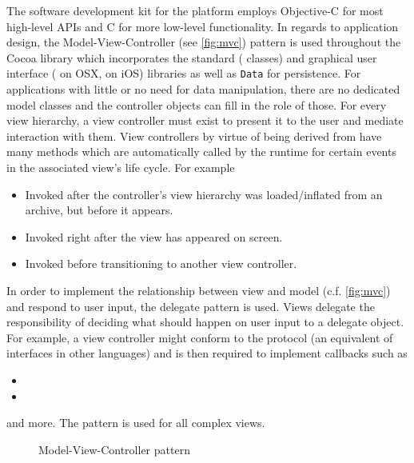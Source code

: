 The software development kit for the platform employs Objective-C for most
high-level APIs and C for more low-level functionality. In regards to
application design, the Model-View-Controller (see \autoref{fig:mvc}) pattern is
used throughout the Cocoa library which incorporates the standard
( classes) and graphical user interface ( on OSX,
 on iOS) libraries as well as  \texttt{Data} for
persistence. For applications with little or no need for data manipulation,
there are no dedicated model classes and the controller objects can fill in the
role of those.  For every view hierarchy, a view
controller must exist to present it to the user and mediate interaction with
them. View controllers by virtue of being derived from 
have many methods which are automatically called by the runtime for certain
events in the associated view's life cycle. For example
\begin{itemize}[align=left]
   \item[\code{viewDidLoad}] Invoked after the controller's view hierarchy was
      loaded/inflated from an archive, but before it appears.
   \item[\code{viewDidAppear}] Invoked right after the view has appeared on
      screen.
   \item[\code{prepareForSegue}] Invoked before transitioning to another view
      controller.
\end{itemize}

In order to implement the relationship between view and model (c.f.
\autoref{fig:mvc}) and respond to user input, the delegate pattern \citep[ch. 1.6]{gamma1995}
is used. Views delegate the responsibility of deciding what should happen on
user input to a delegate object. For example, a view controller might conform to
the  protocol (an equivalent of interfaces in other
languages) and is then required to implement callbacks such as
\begin{itemize}
   \item {}
   \item {}
\end{itemize}
and more. The pattern is used for all complex views.

\begin{figure}[h]
   {\centering      
      
      \caption{Model-View-Controller pattern}
   \label{fig:mvc}}
\end{figure}

